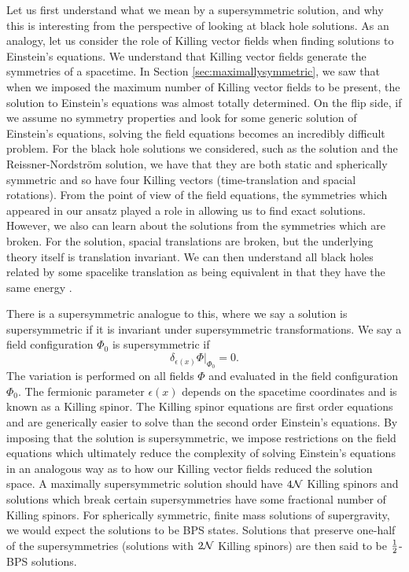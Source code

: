 Let us first understand what we mean by a supersymmetric solution, and why this is interesting from the perspective of looking at black hole solutions. As an analogy, let us consider the role of Killing vector fields when finding solutions to Einstein's equations. We understand that Killing vector fields generate the symmetries of a spacetime. In Section \ref{sec:maximallysymmetric}, we saw that when we imposed the maximum number of Killing vector fields to be present, the solution to Einstein's equations was almost totally determined. On the flip side, if we assume no symmetry properties and look for some generic solution of Einstein's equations, solving the field equations becomes an incredibly difficult problem. For the black hole solutions we considered, such as the \sch solution and the Reissner-Nordstr\"om solution, we have that they are both static and spherically symmetric and so have four Killing vectors (time-translation and spacial rotations). From the point of view of the field equations, the symmetries which appeared in our ansatz played a role in allowing us to find exact solutions. However, we also can learn about the solutions from the symmetries which are broken. For the \sch solution, spacial translations are broken, but the underlying theory itself is translation invariant. We can then understand all black holes related by some spacelike translation as being equivalent in that they have the same energy \cite{Mohaupt:2000gc}.

There is a supersymmetric analogue to this, where we say a solution is supersymmetric if it is invariant under supersymmetric transformations. We say a field configuration $\Phi_0$ is supersymmetric if
\begin{equation}
\label{eq:killingspinor}
	\delta_{\epsilon(x)} \Phi \big|_{\Phi_0} = 0.
\end{equation} 
The variation is performed on all fields $\Phi$ and evaluated in the field configuration $\Phi_0$. The fermionic parameter $\epsilon(x)$ depends on the spacetime coordinates and is known as a Killing spinor. The Killing spinor equations  are first order equations and are generically easier to solve than the second order Einstein's equations. By imposing that the solution is supersymmetric, we impose restrictions on the field equations which ultimately reduce the complexity of solving Einstein's equations in an analogous way as to how our Killing vector fields reduced the solution space. A maximally supersymmetric solution should have $4{\cal N}$ Killing spinors and solutions which break certain supersymmetries have some fractional number of Killing spinors. For spherically symmetric, finite mass solutions of supergravity, we would expect the solutions to be BPS states. Solutions that preserve one-half of the supersymmetries (solutions with $2{\cal N}$ Killing spinors) are then said to be $\frac{1}{2}$-BPS solutions.

